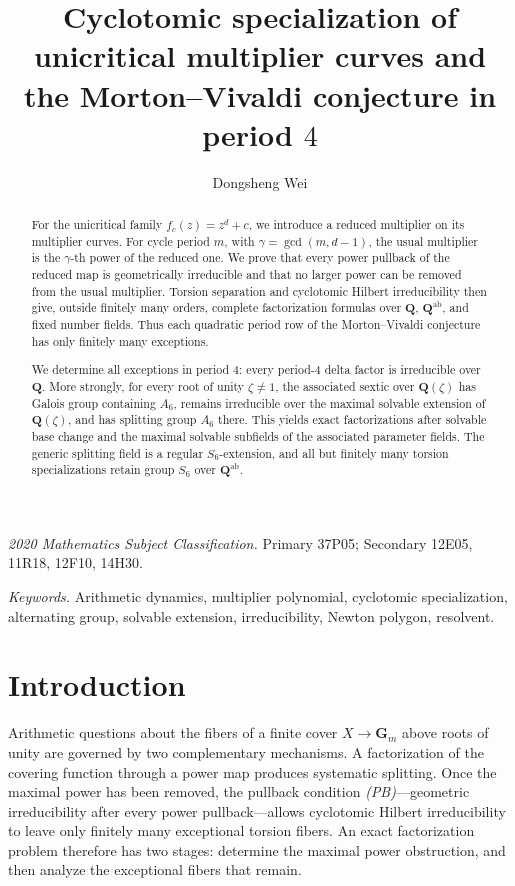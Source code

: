 \documentclass[11pt]{article}
\title{Cyclotomic specialization of unicritical multiplier curves
and the Morton--Vivaldi conjecture in period $4$}
\author{Dongsheng Wei}
\date{}
\newcommand{\Q}{\mathbf Q}
\begin{document}
\maketitle

\begin{abstract}
For the unicritical family $f_c(z)=z^d+c$, we introduce a reduced
multiplier on its multiplier curves.  For cycle period $m$, with
$\gamma=\gcd(m,d-1)$, the usual multiplier is the $\gamma$-th power of
the reduced one.  We prove that every power pullback of the reduced map
is geometrically irreducible and that no larger power can be removed
from the usual multiplier.  Torsion separation and cyclotomic Hilbert
irreducibility then give, outside finitely many orders, complete
factorization formulas over $\Q$, $\Q^{\mathrm{ab}}$, and fixed number
fields.  Thus each quadratic period row of the Morton--Vivaldi
conjecture has only finitely many exceptions.

We determine all exceptions in period $4$: every period-$4$ delta
factor is irreducible over $\Q$.  More strongly, for every root of unity
$\zeta\ne1$, the associated sextic over $\Q(\zeta)$ has Galois group
containing $A_6$, remains irreducible over the maximal solvable
extension of $\Q(\zeta)$, and has splitting group $A_6$ there.  This
yields exact factorizations after solvable base change and the maximal
solvable subfields of the associated parameter fields.  The generic
splitting field is a regular $S_6$-extension, and all but finitely many
torsion specializations retain group $S_6$ over $\Q^{\mathrm{ab}}$.
\end{abstract}

\medskip
\noindent\textit{2020 Mathematics Subject Classification.}
Primary 37P05; Secondary 12E05, 11R18, 12F10, 14H30.

\smallskip
\noindent\textit{Keywords.}
Arithmetic dynamics, multiplier polynomial, cyclotomic specialization,
alternating group, solvable extension, irreducibility, Newton polygon,
resolvent.

\clearpage
\begingroup
\setcounter{tocdepth}{1}
\tableofcontents
\endgroup
\clearpage

\section{Introduction}

Arithmetic questions about the fibers of a finite cover
$X\to\mathbf G_m$ above roots of unity are governed by two
complementary mechanisms.  A factorization of the covering function
through a power map produces systematic splitting.  Once the maximal
power has been removed, the pullback condition \emph{(PB)}---geometric
irreducibility after every power pullback---allows cyclotomic Hilbert
irreducibility to leave only finitely many exceptional torsion fibers.
An exact factorization problem therefore has two stages: determine the
maximal power obstruction, and then analyze the exceptional fibers that
remain.
\end{document}
